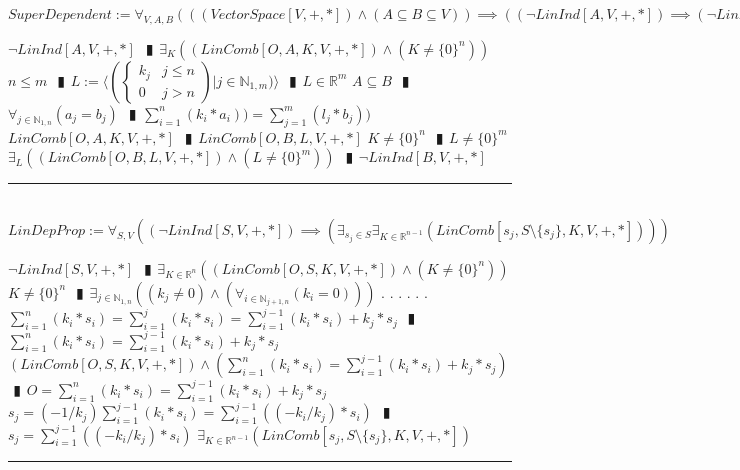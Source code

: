 \documentclass{book}
\newcommand{\abr}{:=}
\newcommand{\cont}{\phantom{.}. . .\phantom{.}}
\newcommand{\pipe}{$\phantom{(}\vrectangleblack\phantom{)}$}
\newcommand{\pr}[1]{\left(#1\right)}
\begin{document}
$SuperDependent \abr \forall_{V, A, B}\pr{\pr{(VectorSpace[V, +, *]) \land (A \subseteq B \subseteq V)} \implies \pr{(\lnot LinInd[A, V, +, *]) \implies (\lnot LinInd[B, V, +, *])}}$
\begin{enumerate}
  \lit $\lnot LinInd[A, V, +, *]$ \pipe $\exists_{K}\pr{(LinComb[O, A, K, V, +, *]) \land (K \neq \{0\}^n)}$
  \lit $n \leq m$ \pipe $L \abr \langle \left(\begin{cases} 
      k_j & j \leq n \\
      0 & j > n 
    \end{cases}\right) | j \in \mathbb{N}_{1, m}) \rangle$ \pipe $L \in \mathbb{R}^m$
  \lit $A \subseteq B$ \pipe $\forall_{j \in \mathbb{N}_{1, n}}(a_j = b_j)$ \pipe $\sum_{i = 1}^{n}(k_i * a_i)) = \sum_{j = 1}^{m}(l_j * b_j))$
  \lit $LinComb[O, A, K, V, +, *]$ \pipe $LinComb[O, B, L, V, +, *]$
  \lit $K \neq \{0\}^n$ \pipe $L \neq \{0\}^m$
  \lit $\exists_{L}\pr{(LinComb[O, B, L, V, +, *]) \land (L \neq \{0\}^m)}$ \pipe $\lnot LinInd[B, V, +, *]$
\end{enumerate} \vspace{.75mm} \hrule \vspace{.75mm} \ \\ 

$LinDepProp \abr \forall_{S, V}\pr{(\lnot LinInd[S, V, +, *]) \implies \pr{\exists_{s_j \in S} \exists_{K \in \mathbb{R}^{n - 1}}(LinComb[s_j, S \setminus \{s_j\}, K, V, +, *])}}$
\begin{enumerate}
  \lit $\lnot LinInd[S, V, +, *]$ \pipe $\exists_{K \in \mathbb{R}^n}\pr{(LinComb[O, S, K, V, +, *]) \land (K \neq \{0\}^n)}$
  \lit $K \neq \{0\}^n$ \pipe $\exists_{j \in \mathbb{N}_{1, n}}\pr{(k_j \neq 0) \land \pr{\forall_{i \in \mathbb{N}_{j + 1, n}}(k_i = 0)}}$ \cont
  \lit \cont $\sum_{i = 1}^{n}(k_i * s_i) = \sum_{i = 1}^{j}(k_i * s_i) = \sum_{i = 1}^{j - 1}(k_i * s_i) + k_j * s_j$ \pipe $\sum_{i = 1}^{n}(k_i * s_i) = \sum_{i = 1}^{j - 1}(k_i * s_i) + k_j * s_j$
  \lit $(LinComb[O, S, K, V, +, *]) \land \pr{\sum_{i = 1}^{n}(k_i * s_i) = \sum_{i = 1}^{j - 1}(k_i * s_i) + k_j * s_j}$ \pipe $O = \sum_{i = 1}^{n}(k_i * s_i) = \sum_{i = 1}^{j - 1}(k_i * s_i) + k_j * s_j$
  \lit $s_j = (-1/k_j) \sum_{i = 1}^{j - 1}(k_i * s_i) = \sum_{i = 1}^{j - 1}\pr{(-k_i / k_j) * s_i}$ \pipe $s_j = \sum_{i = 1}^{j - 1}\pr{(-k_i / k_j) * s_i}$
  \lit $\exists_{K \in \mathbb{R}^{n - 1}}(LinComb[s_j, S \setminus \{s_j\}, K, V, +, *])$
\end{enumerate} \vspace{.75mm} \hrule \vspace{.75mm} \ \\ 
\end{document}
